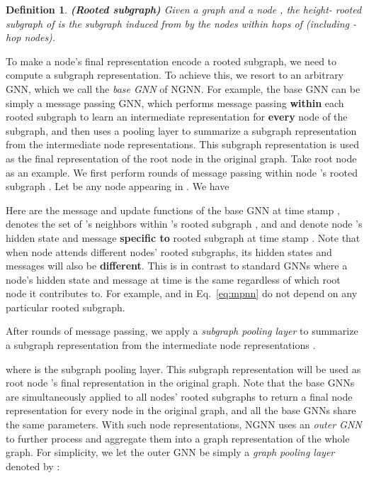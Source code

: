 \documentclass{article}
\newtheorem{definition}{Definition}
\begin{document}
\begin{definition}\label{def:rooted_subgraph}
\textbf{(Rooted subgraph)} Given a graph  and a node , the height- rooted subgraph  of  is the subgraph induced from  by the nodes within  hops of  (including -hop nodes).\end{definition}





To make a node's final representation encode a rooted subgraph, we need to compute a subgraph representation. To achieve this, we resort to an arbitrary GNN, which we call the \textit{base GNN} of NGNN. For example, the base GNN can be simply a message passing GNN, which performs message passing \textbf{within} each rooted subgraph to learn an intermediate representation for \textbf{every} node of the subgraph, and then uses a pooling layer to summarize a subgraph representation from the intermediate node representations. This subgraph representation is used as the final representation of the root node in the original graph. 
Take root node  as an example. We first perform  rounds of message passing within node 's rooted subgraph . Let  be any node appearing in . We have

Here  are the message and update functions of the base GNN at time stamp ,  denotes the set of 's neighbors within 's rooted subgraph , and  and  denote node 's hidden state and message \textbf{specific to} rooted subgraph  at time stamp . Note that when node  attends different nodes' rooted subgraphs, its hidden states and messages will also be \textbf{different}. This is in contrast to standard GNNs where a node's hidden state and message at time  is the same regardless of which root node it contributes to. For example,  and  in Eq.~\ref{eq:mpnn} do not depend on any particular rooted subgraph.



After  rounds of message passing, we apply a \textit{subgraph pooling layer} to summarize a subgraph representation  from the intermediate node representations .

where  is the subgraph pooling layer. This subgraph representation  will be used as root node 's final representation  in the original graph. Note that
the base GNNs are simultaneously applied to all nodes' rooted subgraphs to return a final node representation for every node in the original graph, and all the base GNNs share the same parameters. With such node representations, NGNN uses an \textit{outer GNN} to further process and aggregate them into a graph representation of the whole graph. For simplicity, we let the outer GNN be simply a \textit{graph pooling layer} denoted by :
\end{document}
